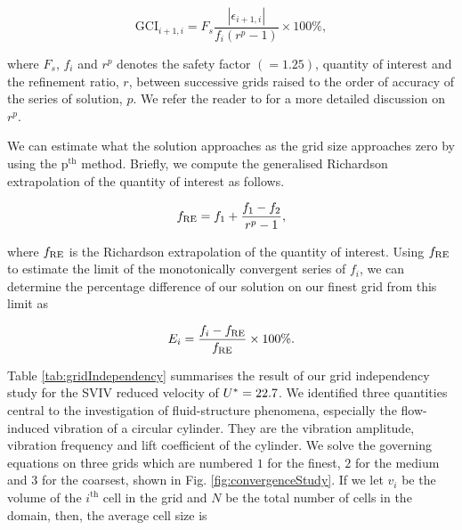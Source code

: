 \documentclass[a4paper,fleqn]{cas-sc}
\begin{document}
\begin{equation}
  \text{GCI}_{i+1,i} = F_{s} \frac{\left |\epsilon_{i+1,i} \right |}{f_{i} \left ( r^{p} - 1 \right )} \times 100\%,
  \label{eq:gci}
\end{equation}

\noindent where $F_{s}$, $f_{i}$ and $r^{p}$ denotes the safety factor $\left ( = 1.25 \right )$, quantity of interest and the refinement ratio, $r$, between successive grids raised to the order of accuracy of the series of solution, $p$. We refer the reader to \citet{Stern2001,Langley2018} for a more detailed discussion on $r^{p}$.

We can estimate what the solution approaches as the grid size approaches zero by using the $\text{p}^{\text{th}}$ method. Briefly, we compute the generalised Richardson extrapolation of the quantity of interest as follows.

\begin{equation}
  f_{\text{RE}} = f_{1} + \frac{f_{1} - f_{2}}{r^{p} - 1},
  \label{eq:richardsonExtrapolation}
\end{equation}

\noindent where $f_{\text{RE}}$ is the Richardson extrapolation of the quantity of interest. Using $f_{\text{RE}}$ to estimate the limit of the monotonically convergent series of $f_{i}$, we can determine the percentage difference of our solution on our finest grid from this limit as

\begin{equation}
  E_{i} = \frac{f_{i} - f_{\text{RE}}}{f_{\text{RE}}} \times 100\%.
  \label{eq:percentageDifference}
\end{equation}

Table \ref{tab:gridIndependency} summarises the result of our grid independency study for the SVIV reduced velocity of $U^{*} = 22.7$. We identified three quantities central to the investigation of fluid-structure phenomena, especially the flow-induced vibration of a circular cylinder. They are the vibration amplitude, vibration frequency and lift coefficient of the cylinder. We solve the governing equations on three grids which are numbered $1$ for the finest, $2$ for the medium and $3$ for the coarsest, shown in Fig. \ref{fig:convergenceStudy}. If we let $v_{i}$ be the volume of the $i^{\text{th}}$ cell in the grid and $N$ be the total number of cells in the domain, then, the average cell size is
\end{document}
